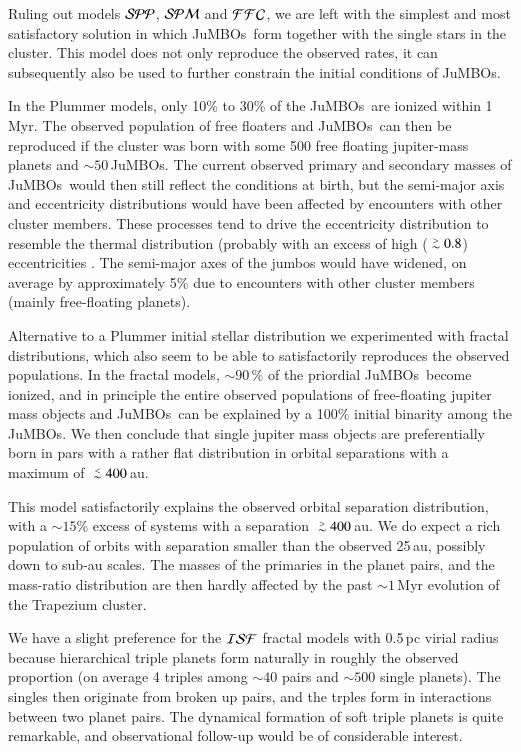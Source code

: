 \documentclass[submission,phys]{lib/SciPost}
\def\apgt{\ {\raise-.5ex\hbox{$\buildrel>\over\sim$}}\ }
\def\aplt{\ {\raise-.5ex\hbox{$\buildrel<\over\sim$}}\ }
\newcommand{\jumbos}{\mbox{JuMBOs}}
\begin{document}
Ruling out models ${\cal SPP}$, ${\cal SPM}$ and ${\cal FFC}$, we are
left with the simplest and most satisfactory solution in which
\jumbos\, form together with the single stars in the cluster.  This
model does not only reproduce the observed rates, it can subsequently
also be used to further constrain the initial conditions of \jumbos.

In the Plummer models, only 10\% to 30\% of the \jumbos\, are ionized
within 1\,Myr.  The observed population of free floaters and \jumbos\,
can then be reproduced if the cluster was born with some 500 free
floating jupiter-mass planets and $\sim 50$\,\jumbos. The current
observed primary and secondary masses of \jumbos\, would then still
reflect the conditions at birth, but the semi-major axis and
eccentricity distributions would have been affected by encounters with
other cluster members. These processes tend to drive the eccentricity
distribution to resemble the thermal distribution (probably with an
excess of high ($\apgt 0.8$) eccentricities
\cite{2000IJoMP...15..4871P}. The semi-major axes of the jumbos would
have widened, on average by approximately 5\% due to encounters with
other cluster members (mainly free-floating planets).

Alternative to a Plummer initial stellar distribution we experimented
with fractal distributions, which also seem to be able to
satisfactorily reproduces the observed populations. In the fractal
models, $\sim 90$\,\% of the priordial \jumbos\, become ionized, and
in principle the entire observed populations of free-floating jupiter
mass objects and \jumbos\, can be explained by a 100\% initial
binarity among the \jumbos. We then conclude that single jupiter mass
objects are preferentially born in pars with a rather flat
distribution in orbital separations with a maximum of $\aplt 400$\,au.

This model satisfactorily explains the observed orbital separation
distribution, with a $\sim 15$\% excess of systems with a separation
$\apgt 400$\,au. We do expect a rich population of orbits with
separation smaller than the observed 25\,au, possibly down to sub-au
scales.  The masses of the primaries in the planet pairs, and the
mass-ratio distribution are then hardly affected by the past $\sim
1$\,Myr evolution of the Trapezium cluster.

We have a slight preference for the ${\cal ISF}$ fractal models with
0.5\,pc virial radius because hierarchical triple planets form
naturally in roughly the observed proportion (on average 4 triples
among $\sim 40$ pairs and $\sim 500$ single planets). The singles then
originate from broken up pairs, and the trples form in interactions
between two planet pairs. The dynamical formation of soft triple
planets is quite remarkable, and observational follow-up would be of
considerable interest.
\end{document}
